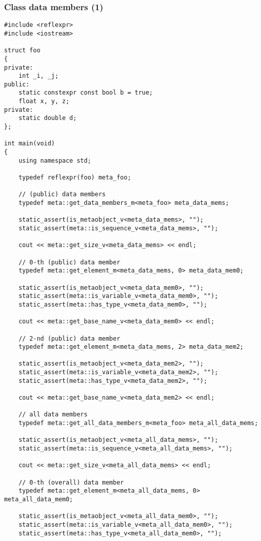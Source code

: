 \subsubsection{Class data members (1)}

\begin{verbatim}
#include <reflexpr>
#include <iostream>

struct foo
{
private:
	int _i, _j;
public:
	static constexpr const bool b = true;
	float x, y, z;
private:
	static double d;
};

int main(void)
{
	using namespace std;

	typedef reflexpr(foo) meta_foo;

	// (public) data members
	typedef meta::get_data_members_m<meta_foo> meta_data_mems;

	static_assert(is_metaobject_v<meta_data_mems>, "");
	static_assert(meta::is_sequence_v<meta_data_mems>, "");

	cout << meta::get_size_v<meta_data_mems> << endl;

	// 0-th (public) data member
	typedef meta::get_element_m<meta_data_mems, 0> meta_data_mem0;

	static_assert(is_metaobject_v<meta_data_mem0>, "");
	static_assert(meta::is_variable_v<meta_data_mem0>, "");
	static_assert(meta::has_type_v<meta_data_mem0>, "");

	cout << meta::get_base_name_v<meta_data_mem0> << endl;

	// 2-nd (public) data member
	typedef meta::get_element_m<meta_data_mems, 2> meta_data_mem2;

	static_assert(is_metaobject_v<meta_data_mem2>, "");
	static_assert(meta::is_variable_v<meta_data_mem2>, "");
	static_assert(meta::has_type_v<meta_data_mem2>, "");

	cout << meta::get_base_name_v<meta_data_mem2> << endl;

	// all data members
	typedef meta::get_all_data_members_m<meta_foo> meta_all_data_mems;

	static_assert(is_metaobject_v<meta_all_data_mems>, "");
	static_assert(meta::is_sequence_v<meta_all_data_mems>, "");

	cout << meta::get_size_v<meta_all_data_mems> << endl;

	// 0-th (overall) data member
	typedef meta::get_element_m<meta_all_data_mems, 0> meta_all_data_mem0;

	static_assert(is_metaobject_v<meta_all_data_mem0>, "");
	static_assert(meta::is_variable_v<meta_all_data_mem0>, "");
	static_assert(meta::has_type_v<meta_all_data_mem0>, "");


\end{verbatim}
